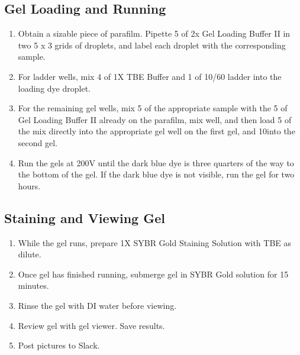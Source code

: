 \documentclass{ssiBio}
\begin{document}
\subsection{Gel Loading and Running}
\begin{enumerate}
\item{Obtain a sizable piece of parafilm. Pipette 5 \uL{} of 2x Gel Loading Buffer II in two 5 x 3 grids of droplets, and label each droplet with the corresponding sample.}
\item{For ladder wells, mix 4 \uL{} of 1X TBE Buffer and 1 \uL{} of 10/60 ladder into the loading dye droplet.}
\item{For the remaining gel wells, mix 5\uL{} of the appropriate sample with the 5\uL{} of Gel Loading Buffer II already on the parafilm, mix well, and then load 5\uL{} of the mix directly into the appropriate gel well on the first gel, and 10\uL into the second gel.}
\item{Run the gels at 200V until the dark blue dye is three quarters of the way to the bottom of the gel. If the dark blue dye is not visible, run the gel for two hours.}
\end{enumerate}

\subsection{Staining and Viewing Gel}
\begin{enumerate}
\item{While the gel runs, prepare 1X SYBR Gold Staining Solution with TBE as dilute.}
\item{Once gel has finished running, submerge gel in SYBR Gold solution for 15 minutes.}
\item{Rinse the gel with DI water before viewing.}
\item{Review gel with gel viewer. Save results.}
\item{Post pictures to Slack.}\\
\end{enumerate} %
\end{document}
